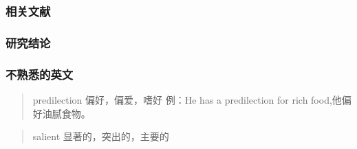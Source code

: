 \documentclass[
]{article}
\begin{document}
\hypertarget{ux76f8ux5173ux6587ux732e-3}{%
\subsubsection{相关文献}\label{ux76f8ux5173ux6587ux732e-3}}

\hypertarget{ux7814ux7a76ux7ed3ux8bba-5}{%
\subsubsection{研究结论}\label{ux7814ux7a76ux7ed3ux8bba-5}}

\hypertarget{ux4e0dux719fux6089ux7684ux82f1ux6587}{%
\subsubsection{不熟悉的英文}\label{ux4e0dux719fux6089ux7684ux82f1ux6587}}

\begin{quote}
predilection 偏好，偏爱，嗜好 例：He has a predilection for rich
food,他偏好油腻食物。
\end{quote}

\begin{quote}
salient 显著的，突出的，主要的
\end{quote}
\end{document}
